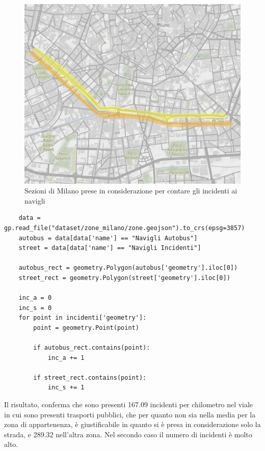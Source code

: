 \documentclass[a4paper]{report}
\begin{document}
\begin{figure}
    \includegraphics[width=\linewidth]{../src/atm/zona_navigli_rect.png}
    \caption{Sezioni di Milano prese in considerazione per contare gli incidenti ai navigli}
    \label{fig:zona-navigli-rect}
\end{figure}

\begin{lstlisting}
    data = gp.read_file("dataset/zone_milano/zone.geojson").to_crs(epsg=3857)
    autobus = data[data['name'] == "Navigli Autobus"]
    street = data[data['name'] == "Navigli Incidenti"]

    autobus_rect = geometry.Polygon(autobus['geometry'].iloc[0])
    street_rect = geometry.Polygon(street['geometry'].iloc[0])

    inc_a = 0
    inc_s = 0
    for point in incidenti['geometry']: 
        point = geometry.Point(point)

        if autobus_rect.contains(point): 
            inc_a += 1
        
        if street_rect.contains(point): 
            inc_s += 1
\end{lstlisting}

Il risultato, conferma che sono presenti 167.09 incidenti per chilometro 
nel viale in cui sono presenti trasporti pubblici, che per quanto non sia nella media per la zona 
di appartenenza, è giustificabile in quanto si è presa in considerazione solo la strada, 
e 289.32 nell'altra zona. Nel secondo caso il numero di incidenti è molto alto.
\end{document}
